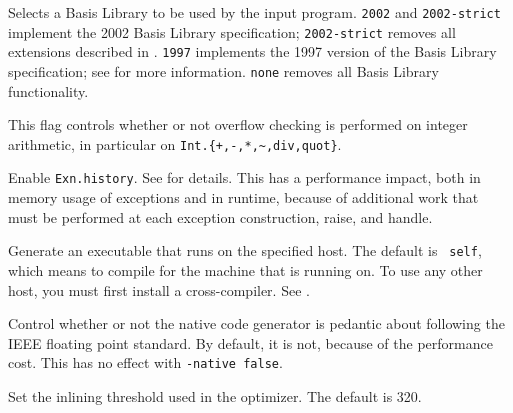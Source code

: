 \begin{description}

Selects a Basis Library to be used by the input program.  {\tt 2002}
and {\tt 2002-strict} implement the 2002 Basis Library
specification; {\tt 2002-strict} removes all extensions described in
.  {\tt 1997} implements the 1997 version of the Basis
Library specification; see  for more information.
{\tt none} removes all Basis Library functionality.

This flag controls whether or not overflow checking is performed on integer
arithmetic, in particular on {\tt Int.\{+,-,*,\~{},div,quot\}}.

%


Enable {\tt Exn.history}.  See  for details.  This has a
performance impact, both in memory usage of exceptions and in runtime,
because of additional work that must be performed at each exception
construction, raise, and handle.

Generate an executable that runs on the specified host.  The default is {\tt
self}, which means to compile for the machine that {\mlton} is running on.  To
use any other host, you must first install a cross-compiler.  See
.

Control whether or not the native code generator is pedantic about following
the IEEE floating point standard.  By default, it is not, because of the
performance cost.  This has no effect with {\tt -native false}.


Set the inlining threshold used in the optimizer.  The default is 320.



\end{description}
